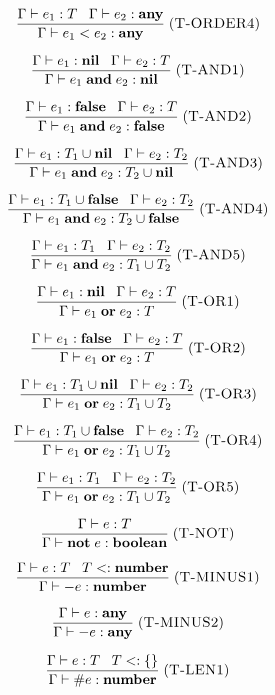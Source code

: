 \[
\frac{\Gamma \vdash e_{1}:T \;\;\;
      \Gamma \vdash e_{2}:\mathbf{any}}
     {\Gamma \vdash e_{1} < e_{2} : \mathbf{any}}
\; (\textsc{T-ORDER4})
\]

\[
\frac{\Gamma \vdash e_{1}:\mathbf{nil} \;\;\;
      \Gamma \vdash e_{2}:T}
     {\Gamma \vdash e_{1} \; \mathbf{and} \; e_{2} : \mathbf{nil}}
\; (\textsc{T-AND1})
\]

\[
\frac{\Gamma \vdash e_{1}:\mathbf{false} \;\;\;
      \Gamma \vdash e_{2}:T}
     {\Gamma \vdash e_{1} \; \mathbf{and} \; e_{2} : \mathbf{false}}
\; (\textsc{T-AND2})
\]

\[
\frac{\Gamma \vdash e_{1}:T_{1} \cup \mathbf{nil} \;\;\;
      \Gamma \vdash e_{2}:T_{2}}
     {\Gamma \vdash e_{1} \; \mathbf{and} \; e_{2} : T_{2} \cup \mathbf{nil}}
\; (\textsc{T-AND3})
\]

\[
\frac{\Gamma \vdash e_{1}:T_{1} \cup \mathbf{false} \;\;\;
      \Gamma \vdash e_{2}:T_{2}}
     {\Gamma \vdash e_{1} \; \mathbf{and} \; e_{2} : T_{2} \cup \mathbf{false}}
\; (\textsc{T-AND4})
\]

\[
\frac{\Gamma \vdash e_{1}:T_{1} \;\;\;
      \Gamma \vdash e_{2}:T_{2}}
     {\Gamma \vdash e_{1} \; \mathbf{and} \; e_{2} : T_{1} \cup T_{2}}
\; (\textsc{T-AND5})
\]

\[
\frac{\Gamma \vdash e_{1}:\mathbf{nil} \;\;\;
      \Gamma \vdash e_{2}:T}
     {\Gamma \vdash e_{1} \; \mathbf{or} \; e_{2} : T}
\; (\textsc{T-OR1})
\]

\[
\frac{\Gamma \vdash e_{1}:\mathbf{false} \;\;\;
      \Gamma \vdash e_{2}:T}
     {\Gamma \vdash e_{1} \; \mathbf{or} \; e_{2} : T}
\; (\textsc{T-OR2})
\]

\[
\frac{\Gamma \vdash e_{1}:T_{1} \cup \mathbf{nil} \;\;\;
      \Gamma \vdash e_{2}:T_{2}}
     {\Gamma \vdash e_{1} \; \mathbf{or} \; e_{2} : T_{1} \cup T_{2}}
\; (\textsc{T-OR3})
\]

\[
\frac{\Gamma \vdash e_{1}:T_{1} \cup \mathbf{false} \;\;\;
      \Gamma \vdash e_{2}:T_{2}}
     {\Gamma \vdash e_{1} \; \mathbf{or} \; e_{2} : T_{1} \cup T_{2}}
\; (\textsc{T-OR4})
\]

\[
\frac{\Gamma \vdash e_{1}:T_{1} \;\;\;
      \Gamma \vdash e_{2}:T_{2}}
     {\Gamma \vdash e_{1} \; \mathbf{or} \; e_{2} : T_{1} \cup T_{2}}
\; (\textsc{T-OR5})
\]

\[
\frac{\Gamma \vdash e:T}
     {\Gamma \vdash \mathbf{not} \; e : \mathbf{boolean}}
\; (\textsc{T-NOT})
\]

\[
\frac{\Gamma \vdash e:T \;\;\;
      T <: \mathbf{number}}
     {\Gamma \vdash - e : \mathbf{number}}
\; (\textsc{T-MINUS1})
\]

\[
\frac{\Gamma \vdash e:\mathbf{any}}
     {\Gamma \vdash - e : \mathbf{any}}
\; (\textsc{T-MINUS2})
\]

\[
\frac{\Gamma \vdash e:T \;\;\;
      T <: \{\}}
     {\Gamma \vdash \# e : \mathbf{number}}
\; (\textsc{T-LEN1})
\]

